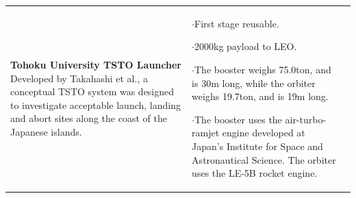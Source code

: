 {\begin{landscape}
\begin{xltabular}{\linewidth}{|X|X|X|}
	\\
	\hline \small 
	\textbf{Tohoku University TSTO Launcher}\cite{Takahashi1997}\newline\newline
	Developed by Takahashi et al.\cite{Takahashi1997}, a conceptual TSTO system was designed to investigate acceptable launch, landing and abort sites along the coast of the Japanese islands. 
	&\small
	
	$\cdot$First stage reusable. 
	
	$\cdot$2000kg payload to LEO. 
	
	$\cdot$The booster weighs 75.0ton, and is 30m long, while the orbiter weighs 19.7ton, and is 19m long.
	
	$\cdot$The booster uses the air-turbo-ramjet engine developed at Japan's Institute for Space and Astronautical Science. The orbiter uses the LE-5B rocket engine. 
	
	&\small
	

\end{xltabular}
\end{landscape}}
